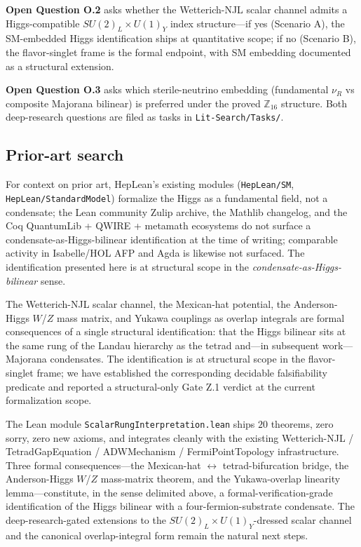 \documentclass[aps,prd,twocolumn,showpacs,superscriptaddress,nofootinbib]{revtex4-2}
\begin{document}
\textbf{Open Question O.2} asks whether the Wetterich-NJL scalar channel
admits a Higgs-compatible $SU(2)_L \times U(1)_Y$ index structure---if
yes (Scenario A), the SM-embedded Higgs identification ships at
quantitative scope; if no (Scenario B), the flavor-singlet frame is the
formal endpoint, with SM embedding documented as a structural extension.

\textbf{Open Question O.3} asks which sterile-neutrino embedding
(fundamental $\nu_R$ vs composite Majorana bilinear) is preferred under
the proved $\mathbb{Z}_{16}$ structure. Both deep-research questions are
filed as tasks in \texttt{Lit-Search/Tasks/}.

\subsection*{Prior-art search}

For context on prior art, HepLean's existing modules
(\texttt{HepLean/SM}, \texttt{HepLean/StandardModel}) formalize the
Higgs as a fundamental field, not a condensate; the Lean community
Zulip archive, the Mathlib changelog, and the Coq QuantumLib + QWIRE +
metamath ecosystems do not surface a condensate-as-Higgs-bilinear
identification at the time of writing; comparable activity in
Isabelle/HOL AFP and Agda is likewise not surfaced. The identification
presented here is at structural scope in the
\emph{condensate-as-Higgs-bilinear} sense.
\label{sec:conclusion}

The Wetterich-NJL scalar channel, the Mexican-hat potential, the
Anderson-Higgs $W$/$Z$ mass matrix, and Yukawa couplings as overlap
integrals are formal consequences of a single structural identification:
that the Higgs bilinear sits at the same rung of the Landau hierarchy
as the tetrad and---in subsequent work---Majorana condensates. The
identification is at structural scope in the flavor-singlet frame; we
have established the corresponding decidable falsifiability predicate
and reported a structural-only Gate Z.1 verdict at the current
formalization scope.

The Lean module \texttt{ScalarRungInterpretation.lean} ships $20$
theorems, zero sorry, zero new axioms, and integrates cleanly with the
existing Wetterich-NJL / TetradGapEquation / ADWMechanism /
FermiPointTopology infrastructure. Three formal consequences---the
Mexican-hat $\leftrightarrow$ tetrad-bifurcation bridge, the
Anderson-Higgs $W$/$Z$ mass-matrix theorem, and the Yukawa-overlap
linearity lemma---constitute, in the sense delimited above, a
formal-verification-grade identification of the Higgs bilinear with a
four-fermion-substrate condensate. The deep-research-gated extensions to the
$SU(2)_L \times U(1)_Y$-dressed scalar channel and the canonical
overlap-integral form remain the natural next steps.
\end{document}
